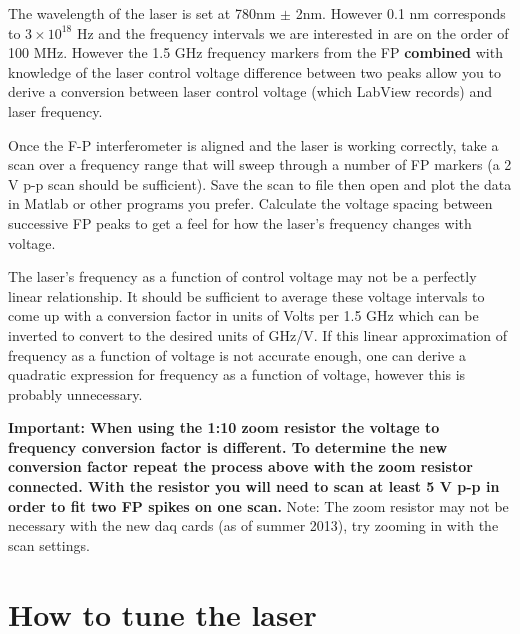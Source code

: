 \documentclass{../lab}
\begin{document}
The wavelength of the laser is set at 780nm $\pm$ 2nm. However 0.1 nm corresponds to $3 \times 10^{18}$ Hz and the frequency intervals we are interested in are on the order of 100 MHz. However the 1.5 GHz frequency markers from the FP \textbf{combined} with knowledge of the laser control voltage difference between two peaks allow you to derive a conversion between laser control voltage (which LabView records) and laser frequency.

Once the F-P interferometer is aligned and the laser is working correctly, take a scan over a frequency range that will sweep through a number of FP markers (a 2 V p-p scan should be sufficient). Save the scan to file then open and plot the data in Matlab or other programs you prefer. Calculate the voltage spacing between successive FP peaks to get a feel for how the laser's frequency changes with voltage.

The laser's frequency as a function of control voltage may not be a perfectly linear relationship. It should be sufficient to average these voltage intervals to come up with a conversion factor in units of Volts per 1.5 GHz which can be inverted to convert to the desired units of GHz/V. If this linear approximation of frequency as a function of voltage is not accurate enough, one can derive a quadratic expression for frequency as a function of voltage, however this is probably unnecessary.



\textbf{Important: When using the 1:10 zoom resistor the voltage to frequency conversion factor is different. To determine the new conversion factor repeat the process above with the zoom resistor connected. With the resistor you will need to scan at least 5 V p-p in order to fit two FP spikes on one scan.} Note: The zoom resistor may not be necessary with the new daq cards (as of summer 2013), try zooming in with the scan settings.

\newpage

\section{How to tune the laser}
\end{document}
